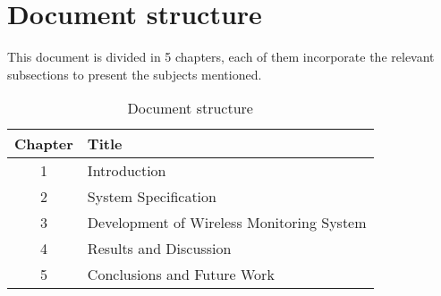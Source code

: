 \section{Document structure}

This document is divided in 5 chapters, each of them incorporate the relevant subsections to present the subjects mentioned. 

\begin{table}[!h]
    \label{tb:struct}
    \centering
    \caption{Document structure}
    \vspace{0.2em}
    \begin{tabular}{c|l}%
    \textbf{Chapter} & \textbf{Title}                    \\ \hline
    1       &                   Introduction             \\ \hline
    2       &                   System Specification    \\ \hline
    3       &                   Development of Wireless Monitoring System    \\ \hline
    4       &                   Results and Discussion    \\ \hline
    5       &                   Conclusions and Future Work      \\ 
    \end{tabular}
\end{table}